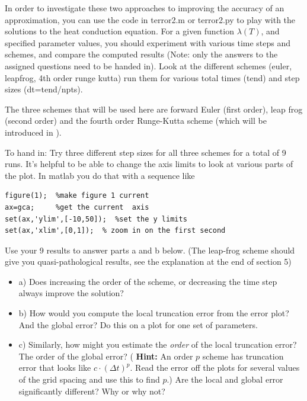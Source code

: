 \begin{problem}
  \label{lab2:prob:accuracy}
  In order to investigate these two approaches to improving the
  accuracy of an approximation, you can use the code in terror2.m
  or terror2.py to play with the solutions to the heat conduction equation.
  For a given function $\lambda(T)$, and specified parameter values,
  you should experiment with various time steps and schemes, and
  compare the computed results (Note: only the answers to the assigned
  questions need to be handed in).   Look at the different schemes
  (euler, leapfrog, 4th order runge kutta) run them for various
  total times (tend) and step sizes (dt=tend/npts).

  The three schemes that will be used here are forward Euler (first
  order), leap frog (second order) and the fourth order Runge-Kutta
  scheme (which will be introduced in
  ).  

  To hand in:  Try three different step sizes for all three
  schemes for a total of 9 runs.  It's helpful to be able to change
  the axis limits to look at various parts of the plot. In matlab
  you do that with a sequence like

\begin{verbatim}
figure(1);  %make figure 1 current
ax=gca;     %get the current  axis
set(ax,'ylim',[-10,50]);  %set the y limits
set(ax,'xlim',[0,1]);  % zoom in on the first second
\end{verbatim}

Use your 9 results to answer parts a and b below.  (The leap-frog
scheme should give you quasi-pathological results, see the explanation at
the end of section 5)


  \begin {itemize}
  \item a) Does increasing the order of the
    scheme, or decreasing the time step always improve the solution?
  \item b) How would you compute the local truncation error from the
    error plot?  And the global error?  Do this on a plot for
    one set of parameters.
  \item c) Similarly, how might you estimate the \emph{ order} of the local
    truncation error?  The order of the global error? (\textbf{ Hint:} An
    order $p$ scheme has truncation error that looks like
    $c\cdot(\Delta t)^p$.  Read the error off the plots for several
    values of the grid spacing and use this to find $p$.)  
    Are the
    local and global error significantly
    different?  Why or why not?
  \end{itemize}
\end{problem}


